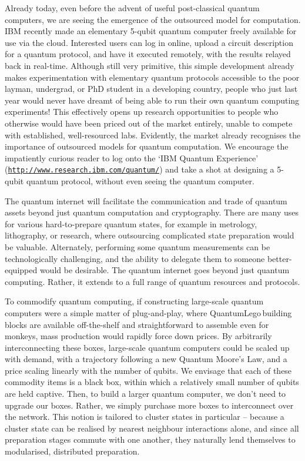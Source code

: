 \documentclass[aps,rmp,twocolumn,amsmath,amssymb,nofootinbib,superscriptaddress,longbibliography,floatfix,table-of-contents,eqsecnum]{revtex4-1}
\begin{document}
Already today, even before the advent of useful post-classical quantum computers, we are seeing the emergence of the outsourced model for computation. IBM recently made an elementary 5-qubit quantum computer freely available for use via the cloud. Interested users can log in online, upload a circuit description for a quantum protocol, and have it executed remotely, with the results relayed back in real-time. Although still very primitive, this simple development already makes experimentation with elementary quantum protocols accessible to the poor layman, undergrad, or PhD student in a developing country, people who just last year would never have dreamt of being able to run their own quantum computing experiments! This effectively opens up research opportunities to people who otherwise would have been priced out of the market entirely, unable to compete with established, well-resourced labs. Evidently, the market already recognises the importance of outsourced models for quantum computation. We encourage the impatiently curious reader to log onto the `IBM Quantum Experience' (\texttt{\href{http://www.research.ibm.com/quantum/}{http://www.research.ibm.com/quantum/}}) and take a shot at designing a 5-qubit quantum protocol, without even seeing the quantum computer.

The quantum internet will facilitate the communication and trade of quantum assets beyond just quantum computation and cryptography. There are many uses for various hard-to-prepare quantum states, for example in metrology, lithography, or research, where outsourcing complicated state preparation would be valuable. Alternately, performing some quantum measurements can be technologically challenging, and the ability to delegate them to someone better-equipped would be desirable. The quantum internet goes beyond just quantum computing. Rather, it extends to a full range of quantum resources and protocols. 

To commodify quantum computing, if constructing large-scale quantum computers were a simple matter of plug-and-play, where QuantumLego\texttrademark \,building blocks are available off-the-shelf and straightforward to assemble even for monkeys, mass production would rapidly force down prices. By arbitrarily interconnecting these boxes, large-scale quantum computers could be scaled up with demand, with a trajectory following a new Quantum Moore's Law, and a price scaling linearly with the number of qubits. We envisage that each of these commodity items is a black box, within which a relatively small number of qubits are held captive. Then, to build a larger quantum computer, we don't need to upgrade our boxes. Rather, we simply purchase more boxes to interconnect over the network. This notion is tailored to cluster states in particular -- because a cluster state can be realised by nearest neighbour interactions alone, and since all preparation stages commute with one another, they naturally lend themselves to modularised, distributed preparation.
\end{document}
